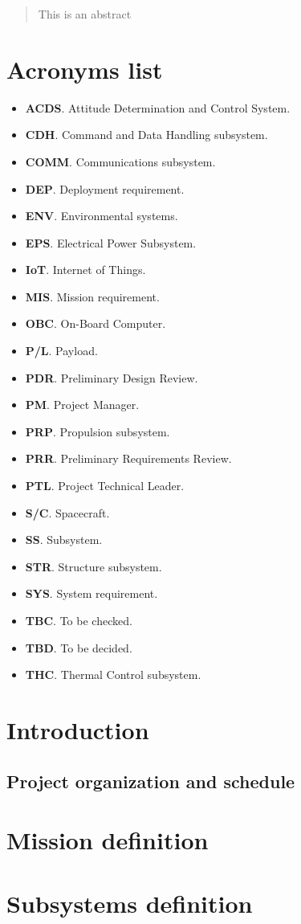 \begin{abstract}
This is an abstract
\end{abstract}

\section*{Acronyms list}

\begin{itemize}
	\item \textbf{ACDS}. Attitude Determination and Control System.
	\item \textbf{CDH}. Command and Data Handling subsystem.
	\item \textbf{COMM}. Communications subsystem.
	\item \textbf{DEP}. Deployment requirement.
	\item \textbf{ENV}. Environmental systems.
	\item \textbf{EPS}. Electrical Power Subsystem.
	\item \textbf{IoT}. Internet of Things.
	\item \textbf{MIS}. Mission requirement.
	\item \textbf{OBC}. On-Board Computer.
	\item \textbf{P/L}. Payload.
	\item \textbf{PDR}. Preliminary Design Review.
	\item \textbf{PM}. Project Manager.
	\item \textbf{PRP}. Propulsion subsystem.
	\item \textbf{PRR}. Preliminary Requirements Review.
	\item \textbf{PTL}. Project Technical Leader.
	\item \textbf{S/C}. Spacecraft.
	\item \textbf{SS}. Subsystem.
	\item \textbf{STR}. Structure subsystem.
	\item \textbf{SYS}. System requirement.
	\item \textbf{TBC}. To be checked.
	\item \textbf{TBD}. To be decided.
	\item \textbf{THC}. Thermal Control subsystem.
\end{itemize}

\section{Introduction}

\subsection{Project organization and schedule}


\section{Mission definition}

\section{Subsystems definition}
